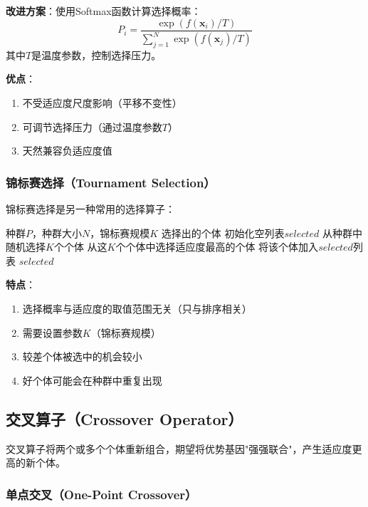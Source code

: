 \textbf{改进方案}：使用Softmax函数计算选择概率：
\[
P_i = \frac{\exp(f(\mathbf{x}_i)/T)}{\sum_{j=1}^{N} \exp(f(\mathbf{x}_j)/T)}
\]
其中$T$是温度参数，控制选择压力。

\textbf{优点}：
\begin{enumerate}
    \item 不受适应度尺度影响（平移不变性）
    \item 可调节选择压力（通过温度参数$T$）
    \item 天然兼容负适应度值
\end{enumerate}

\subsubsection{锦标赛选择（Tournament Selection）}

锦标赛选择是另一种常用的选择算子：

\begin{algorithm}[H]
\caption{锦标赛选择}
\begin{algorithmic}[1]
\REQUIRE 种群$P$，种群大小$N$，锦标赛规模$K$
\ENSURE 选择出的个体
\STATE 初始化空列表$selected$
    \STATE 从种群中随机选择$K$个个体
    \STATE 从这$K$个个体中选择适应度最高的个体
    \STATE 将该个体加入$selected$列表
\ENDWHILE
\RETURN $selected$
\end{algorithmic}
\end{algorithm}

\textbf{特点}：
\begin{enumerate}
    \item 选择概率与适应度的取值范围无关（只与排序相关）
    \item 需要设置参数$K$（锦标赛规模）
    \item 较差个体被选中的机会较小
    \item 好个体可能会在种群中重复出现
\end{enumerate}

\subsection{交叉算子（Crossover Operator）}

交叉算子将两个或多个个体重新组合，期望将优势基因"强强联合"，产生适应度更高的新个体。

\subsubsection{单点交叉（One-Point Crossover）}

